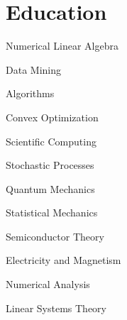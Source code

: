 \documentclass[letterpaper]{hunter}
\begin{document}
	\hfill %
	\begin{minipage}[t]{0.66\textwidth} %
		\section{Education}
			
		\vspace{1.25em}
		\begin{entryList}{2} %
			\item Numerical Linear Algebra
			\item Data Mining
			\item Algorithms
			\item Convex Optimization
			\item Scientific Computing
			\item Stochastic Processes
		\end{entryList}
		
		\begin{entryList}{2}
			\item Quantum Mechanics
			\item Statistical Mechanics
			\item Semiconductor Theory
			\item Electricity and Magnetism
			\item Numerical Analysis
			\item Linear Systems Theory
		\end{entryList}
		
		\vspace{-.7em}
		

\end{minipage}
\end{document}
